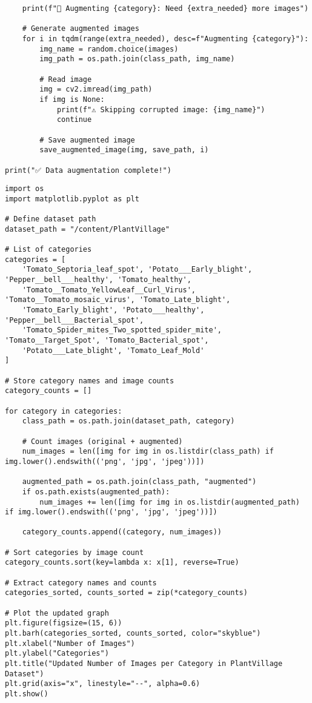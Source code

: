 \documentclass{article}
\begin{document}
\begin{lstlisting}
    print(f"📢 Augmenting {category}: Need {extra_needed} more images")

    # Generate augmented images
    for i in tqdm(range(extra_needed), desc=f"Augmenting {category}"):
        img_name = random.choice(images)
        img_path = os.path.join(class_path, img_name)

        # Read image
        img = cv2.imread(img_path)
        if img is None:
            print(f"⚠️ Skipping corrupted image: {img_name}")
            continue

        # Save augmented image
        save_augmented_image(img, save_path, i)

print("✅ Data augmentation complete!")
\end{lstlisting}
\begin{lstlisting}
import os
import matplotlib.pyplot as plt

# Define dataset path
dataset_path = "/content/PlantVillage"

# List of categories
categories = [
    'Tomato_Septoria_leaf_spot', 'Potato___Early_blight', 'Pepper__bell___healthy', 'Tomato_healthy',
    'Tomato__Tomato_YellowLeaf__Curl_Virus', 'Tomato__Tomato_mosaic_virus', 'Tomato_Late_blight',
    'Tomato_Early_blight', 'Potato___healthy', 'Pepper__bell___Bacterial_spot',
    'Tomato_Spider_mites_Two_spotted_spider_mite', 'Tomato__Target_Spot', 'Tomato_Bacterial_spot',
    'Potato___Late_blight', 'Tomato_Leaf_Mold'
]

# Store category names and image counts
category_counts = []

for category in categories:
    class_path = os.path.join(dataset_path, category)

    # Count images (original + augmented)
    num_images = len([img for img in os.listdir(class_path) if img.lower().endswith(('png', 'jpg', 'jpeg'))])

    augmented_path = os.path.join(class_path, "augmented")
    if os.path.exists(augmented_path):
        num_images += len([img for img in os.listdir(augmented_path) if img.lower().endswith(('png', 'jpg', 'jpeg'))])

    category_counts.append((category, num_images))

# Sort categories by image count
category_counts.sort(key=lambda x: x[1], reverse=True)

# Extract category names and counts
categories_sorted, counts_sorted = zip(*category_counts)

# Plot the updated graph
plt.figure(figsize=(15, 6))
plt.barh(categories_sorted, counts_sorted, color="skyblue")
plt.xlabel("Number of Images")
plt.ylabel("Categories")
plt.title("Updated Number of Images per Category in PlantVillage Dataset")
plt.grid(axis="x", linestyle="--", alpha=0.6)
plt.show()
\end{lstlisting}
\end{document}
